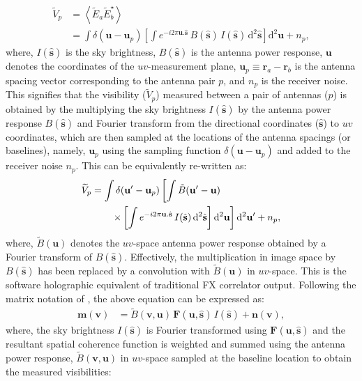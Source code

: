 \documentclass[a4paper,fleqn,usenatbib]{../mnras}
\newcommand{\dif}{\mathrm{d}}
\begin{document}
\begin{align}
  \widetilde{V}_p &= \left\langle \widetilde{E}_a\widetilde{E}_b^\star \right\rangle \label{eqn:cc-vis}\\
                  &= \int\delta(\mathbf{u}-\mathbf{u}_p)\left[\int e^{-i2\pi\mathbf{u}.\hat{\mathbf{s}}}\,B(\hat{\mathbf{s}})\,I(\hat{\mathbf{s}})\,\dif^2\hat{\mathbf{s}}\right] \dif^2\mathbf{u} + n_p,
\end{align}
where, $I(\hat{\mathbf{s}})$ is the sky brightness, $B(\hat{\mathbf{s}})$ is the antenna power response, $\mathbf{u}$ denotes the coordinates of the $uv$-measurement plane, $\mathbf{u}_p\equiv \mathbf{r}_a-\mathbf{r}_b$ is the antenna spacing vector corresponding to the antenna pair $p$, and $n_p$ is the receiver noise. This signifies that the visibility ($\widetilde{V}_p$) measured between a pair of antennas ($p$) is obtained by the multiplying the sky brightness $I(\hat{\mathbf{s}})$ by the antenna power response $B(\hat{\mathbf{s}})$ and Fourier transform from the directional coordinates ($\hat{\mathbf{s}}$) to $uv$ coordinates, which are then sampled at the locations of the antenna spacings (or baselines), namely, $\mathbf{u}_p$ using the sampling function $\delta(\mathbf{u}-\mathbf{u}_p)$ and added to the receiver noise $n_p$. This can be equivalently re-written as:
\begin{align}\label{eqn:software-holography}
  \widetilde{V}_p &= \int\delta(\mathbf{u}^\prime-\mathbf{u}_p)\left[\int \tilde{B}(\mathbf{u}^\prime-\mathbf{u}) \right. \nonumber\\
  &\left. \qquad \times \left[\int e^{-i2\pi\mathbf{u}.\hat{\mathbf{s}}}\,I(\hat{\mathbf{s}})\,\dif^2\hat{\mathbf{s}}\right]\dif^2\mathbf{u}\vphantom{\int}\right] \dif^2\mathbf{u}^\prime + n_p,
\end{align}
where, $\tilde{B}(\mathbf{u})$ denotes the $uv$-space antenna power response obtained by a Fourier transform of $B(\hat{\mathbf{s}})$. Effectively, the multiplication in image space by $B(\hat{\mathbf{s}})$ has been replaced by a convolution with $\tilde{B}(\mathbf{u})$ in $uv$-space. This is the software holographic equivalent of traditional FX correlator output. Following the matrix notation of \citet{mor11}, the above equation can be expressed as:
\begin{align}
  \mathbf{m}(\mathbf{v}) &= \widetilde{B}(\mathbf{v},\mathbf{u})\,\mathbf{F}(\mathbf{u},\hat{\mathbf{s}})\,I(\hat{\mathbf{s}}) + \mathbf{n}(\mathbf{v}),
\end{align}
where, the sky brightness $I(\hat{\mathbf{s}})$ is Fourier transformed using $\mathbf{F}(\mathbf{u},\hat{\mathbf{s}})$ and the resultant spatial coherence function is weighted and summed using the antenna power response, $\widetilde{B}(\mathbf{v},\mathbf{u})$ in $uv$-space sampled at the baseline location to obtain the measured visibilities:
\end{document}
